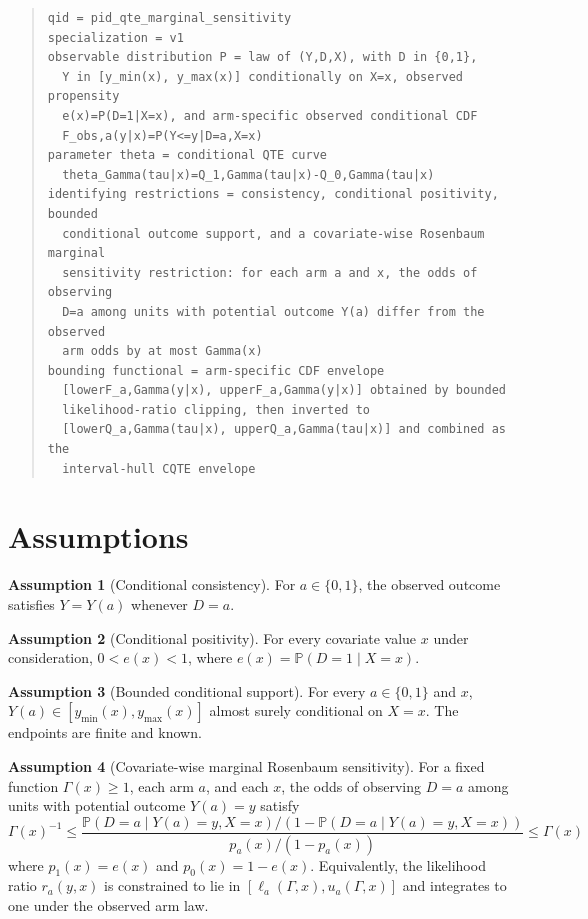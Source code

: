 \documentclass[11pt]{article}
\renewcommand{\Pr}{\mathbb{P}}
\theoremstyle{definition}
\newtheorem{assumption}{Assumption}
\theoremstyle{plain}
\theoremstyle{remark}
\begin{document}
\begin{quote}
\begin{verbatim}
qid = pid_qte_marginal_sensitivity
specialization = v1
observable distribution P = law of (Y,D,X), with D in {0,1},
  Y in [y_min(x), y_max(x)] conditionally on X=x, observed propensity
  e(x)=P(D=1|X=x), and arm-specific observed conditional CDF
  F_obs,a(y|x)=P(Y<=y|D=a,X=x)
parameter theta = conditional QTE curve
  theta_Gamma(tau|x)=Q_1,Gamma(tau|x)-Q_0,Gamma(tau|x)
identifying restrictions = consistency, conditional positivity, bounded
  conditional outcome support, and a covariate-wise Rosenbaum marginal
  sensitivity restriction: for each arm a and x, the odds of observing
  D=a among units with potential outcome Y(a) differ from the observed
  arm odds by at most Gamma(x)
bounding functional = arm-specific CDF envelope
  [lowerF_a,Gamma(y|x), upperF_a,Gamma(y|x)] obtained by bounded
  likelihood-ratio clipping, then inverted to
  [lowerQ_a,Gamma(tau|x), upperQ_a,Gamma(tau|x)] and combined as the
  interval-hull CQTE envelope
\end{verbatim}
\end{quote}

\section{Assumptions}
\begin{assumption}[Conditional consistency]\label{ass:consistency}
For \(a\in\{0,1\}\), the observed outcome satisfies \(Y=Y(a)\) whenever \(D=a\).
\end{assumption}

\begin{assumption}[Conditional positivity]\label{ass:positivity}
For every covariate value \(x\) under consideration, \(0<e(x)<1\), where \(e(x)=\Pr(D=1\mid X=x)\).
\end{assumption}

\begin{assumption}[Bounded conditional support]\label{ass:support}
For every \(a\in\{0,1\}\) and \(x\), \(Y(a)\in[y_{\min}(x),y_{\max}(x)]\) almost surely conditional on \(X=x\).  The endpoints are finite and known.
\end{assumption}

\begin{assumption}[Covariate-wise marginal Rosenbaum sensitivity]\label{ass:msm}
For a fixed function \(\Gamma(x)\ge 1\), each arm \(a\), and each \(x\), the odds of observing \(D=a\) among units with potential outcome \(Y(a)=y\) satisfy
\[
\Gamma(x)^{-1}\le
\frac{\Pr(D=a\mid Y(a)=y,X=x)/(1-\Pr(D=a\mid Y(a)=y,X=x))}
     {p_a(x)/(1-p_a(x))}
\le \Gamma(x)
\]
where \(p_1(x)=e(x)\) and \(p_0(x)=1-e(x)\).  Equivalently, the likelihood ratio \(r_a(y,x)\) is constrained to lie in \([\ell_a(\Gamma,x),u_a(\Gamma,x)]\) and integrates to one under the observed arm law.
\end{assumption}
\end{document}
